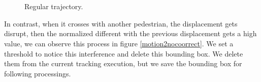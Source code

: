 \documentclass[12pt, a4paper, titlepage,twoside,openright]{article}
\begin{document}
\begin{figure}[H]
		
\centering

\\
\\
\caption{Regular trajectory.}
\label{motion2Correct}
\end{figure}


In contrast, when it crosses with another pedestrian, the displacement gets disrupt, then the normalized different with the previous displacement gets a high value, we can observe this process in figure \ref{motion2nocoorrect}. We set a threshold to notice this interference and delete this bounding box. We delete them from the current tracking execution, but we save the bounding box for following processings.
\end{document}
